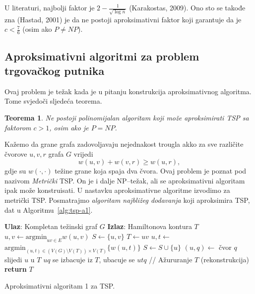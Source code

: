 \documentclass[a4paper, utf8, 11pt, colorlinks]{book}
\newtheorem{thm}{Teorema}
\begin{document}
  \noindent U literaturi, najbolji faktor je $2 - \frac{1}{\sqrt{\log n}}$ (Karakostas, 2009).
  Ono sto se takođe zna (Hastad, 2001) je da ne postoji aproksimativni faktor 
  koji garantuje da je $c < \frac{7}{6}$ (osim ako $P \neq NP$). 
  
  \subsection{Aproksimativni algoritmi za problem trgovačkog putnika}
  
  Ovaj problem je težak kada je u pitanju konstrukcija aproksimativnog algoritma. Tome svjedoči sljedeća teorema.
 \begin{thm}
    Ne postoji polinomijalan algoritam koji može aproksimirati TSP sa  faktorom $c > 1$, osim ako je $P = NP$. 
\end{thm}
  Kažemo da grane grafa zadovoljavaju nejednakost trougla akko za sve različite čvorove $u,v, r$ grafa $G$ vrijedi
  $$ w(u,v) + w(v,r) \geq w(u,r),$$
  gdje su $w(\cdot, \cdot)$ težine grane koja spaja dva čvora. Ovaj problem je poznat 
  pod nazivom \emph{Metrički} TSP. On je i dalje NP--težak, ali se aproksimativni algoritam ipak može konstruisati.  U nastavku aproksimativne algoritme izvodimo za metrički  TSP. Posmatrajmo \emph{algoritam najbližeg dodavanja} koji aproksimira TSP, dat u Algoritmu~\ref{alg:tsp-a1}. 
  
   \begin{algorithm}[!t] 
  
  	\begin{algorithmic}[1]
  		\STATE \textbf{Ulaz}: Kompletan težinski graf $G$
  		\STATE \textbf{Izlaz}: Hamiltonova kontura $T$  
  		\STATE $u,v \gets \mbox{argmin}_{uv \in E} w(u,v)$
  		\STATE $S \gets \{u,v\}$
  		\STATE $T \gets uv$
  		\STATE $u,t \gets$ $\mbox{argmin}_{(u,t) \in (V(G)\setminus V(T)) \times V(T)} \{w(u, t)\}$
  		\STATE $ S \gets S \cup \{u\}$ 
  		\STATE $(u, q)\gets$ čvor $q$ slijedi $u$ u  $T$
  		\STATE  $uq$ se izbacuje iz $T$, ubacuje se $utq$  // Ažururanje $T$ (rekonstrukcija)
  		\ENDWHILE
  		\STATE \textbf{return} $T$
  	\end{algorithmic}
   	\caption{Aproksimativni algoritam 1 za TSP.}
   	\label{alg:tsp-a1}
  \end{algorithm}
\end{document}
